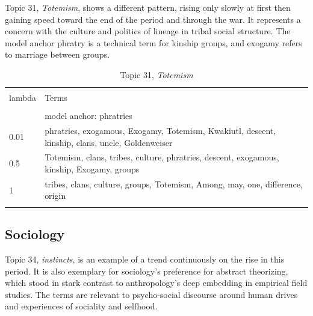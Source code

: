 \documentclass[]{book}
\theoremstyle{definition}
\theoremstyle{definition}
\theoremstyle{definition}
\theoremstyle{remark}
\begin{document}
Topic 31, \emph{Totemism}, shows a different pattern, rising only slowly
at first then gaining speed toward the end of the period and through the
war. It represents a concern with the culture and politics of lineage in
tribal social structure. The model anchor phratry is a technical term
for kinship groups, and exogamy refers to marriage between groups.



\begin{table}[!htbp] \centering 
  \caption{Topic 31, \emph{Totemism}} 
  \label{tab:t31-a} 
\begin{tabularx}{\textwidth}{@{\extracolsep{5pt}} lY} 
\\[-1.8ex]\hline 
\hline \\[-1.8ex] 
lambda & Terms \\ 
\hline \\[-1.8ex] 
 & model anchor: phratries \\ 
0.01 & phratries, exogamous, Exogamy, Totemism, Kwakiutl, descent, kinship, clans, uncle, Goldenweiser \\ 
0.5 & Totemism, clans, tribes, culture, phratries, descent, exogamous, kinship, Exogamy, groups \\ 
1 & tribes, clans, culture, groups, Totemism, Among, may, one, difference, origin \\ 
\hline \\[-1.8ex] 
\end{tabularx} 
\end{table}

\hypertarget{sociology}{%
\subsection{Sociology}\label{sociology}}

Topic 34, \emph{instincts}, is an example of a trend continuously on the
rise in this period. It is also exemplary for sociology's preference for
abstract theorizing, which stood in stark contrast to anthropology's
deep embedding in empirical field studies. The terms are relevant to
psycho-social discourse around human drives and experiences of sociality
and selfhood.
\end{document}
